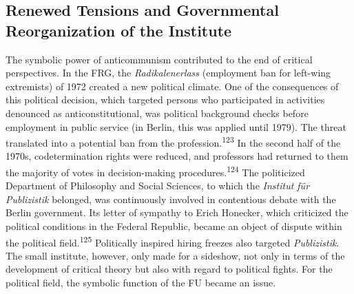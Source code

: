 \documentclass{tufte-handout}
\begin{document}
\hypertarget{renewed-tensions-and-governmental-reorganization-of-the-institute}{%
\subsection{Renewed Tensions and Governmental
Reorganization of the
Institute}\label{renewed-tensions-and-governmental-reorganization-of-the-institute}}

The symbolic power of anticommunism contributed to the end of critical
perspectives. In the FRG, the \emph{Radikalenerlass} (employment ban for
left-wing extremists) of 1972 created a new political climate. One of
the consequences of this political decision, which targeted persons who
participated in activities denounced as anticonstitutional, was
political background checks before employment in public service (in
Berlin, this was applied until 1979). The threat translated into a
potential ban from the profession.\textsuperscript{123} In the second half of the 1970s,
codetermination rights were reduced, and professors had returned to them
the majority of votes in decision-making procedures.\textsuperscript{124} The politicized Department of
Philosophy and Social Sciences, to which the \emph{Institut für
Publizistik} belonged, was continuously involved in contentious debate
with the Berlin government. Its letter of sympathy to Erich Honecker,
which criticized the political conditions in the Federal Republic,
became an object of dispute within the political field.\textsuperscript{125} Politically inspired hiring
freezes also targeted \emph{Publizistik}. The small institute, however,
only made for a sideshow, not only in terms of the development of
critical theory but also with regard to political fights. For the
political field, the symbolic function of the FU became an
issue.
\end{document}
